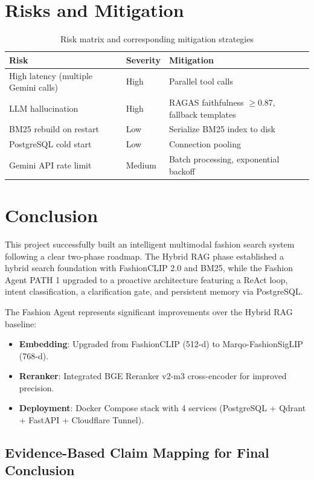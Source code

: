 \section{Risks and Mitigation}

\begin{table}[H]
\centering
\begin{tabular}{lll}
\toprule
\textbf{Risk} & \textbf{Severity} & \textbf{Mitigation}\\
\midrule
High latency (multiple Gemini calls) & High   & Parallel tool calls\\
LLM hallucination                    & High   & RAGAS faithfulness $\geq$0.87, fallback templates\\
BM25 rebuild on restart              & Low    & Serialize BM25 index to disk\\
PostgreSQL cold start                & Low    & Connection pooling\\
Gemini API rate limit                & Medium & Batch processing, exponential backoff\\
\bottomrule
\end{tabular}
\caption{Risk matrix and corresponding mitigation strategies}
\end{table}

\section{Conclusion}
This project successfully built an intelligent multimodal fashion search system following a clear two-phase roadmap. The Hybrid RAG phase established a hybrid search foundation with FashionCLIP 2.0 and BM25, while the Fashion Agent PATH 1 upgraded to a proactive architecture featuring a ReAct loop, intent classification, a clarification gate, and persistent memory via PostgreSQL.

The Fashion Agent represents significant improvements over the Hybrid RAG baseline:
\begin{itemize}
    \item \textbf{Embedding}: Upgraded from FashionCLIP (512-d) to Marqo-FashionSigLIP (768-d).
    \item \textbf{Reranker}: Integrated BGE Reranker v2-m3 cross-encoder for improved precision.
    \item \textbf{Deployment}: Docker Compose stack with 4 services (PostgreSQL + Qdrant + FastAPI + Cloudflare Tunnel).
\end{itemize}

\subsection{Evidence-Based Claim Mapping for Final Conclusion}
\label{subsec:evidence_claim_mapping}

